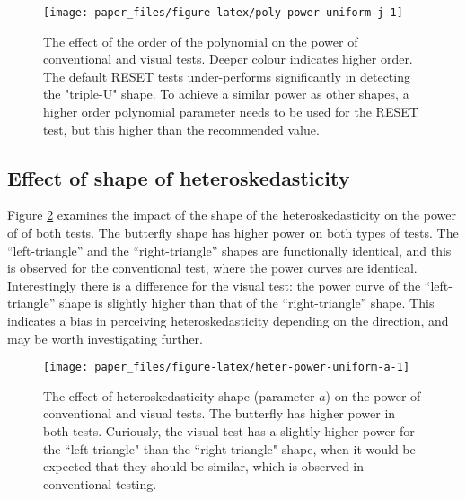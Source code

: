 \documentclass[]{interact}
\theoremstyle{plain}%
\theoremstyle{definition}
\theoremstyle{remark}
\begin{document}
\begin{figure}

{\centering \texttt{[image: paper\_files/figure-latex/poly-power-uniform-j-1]} 

}

\caption{The effect of the order of the polynomial on the power of conventional and visual tests. Deeper colour indicates higher order. The default RESET tests under-performs significantly in detecting the "triple-U" shape. To achieve a similar power as other shapes, a higher order polynomial parameter needs to be used for the RESET test, but this higher than the recommended value.}\label{fig:poly-power-uniform-j}
\end{figure}

\hypertarget{effect-of-shape-of-heteroskedasticity}{%
\subsection{\texorpdfstring{Effect of shape of
heteroskedasticity\label{hetero-analysis}}{Effect of shape of heteroskedasticity}}\label{effect-of-shape-of-heteroskedasticity}}

Figure \ref{fig:heter-power-uniform-a} examines the impact of the shape
of the heteroskedasticity on the power of of both tests. The butterfly
shape has higher power on both types of tests. The ``left-triangle'' and
the ``right-triangle'' shapes are functionally identical, and this is
observed for the conventional test, where the power curves are
identical. Interestingly there is a difference for the visual test: the
power curve of the ``left-triangle'' shape is slightly higher than that
of the ``right-triangle'' shape. This indicates a bias in perceiving
heteroskedasticity depending on the direction, and may be worth
investigating further.

\begin{figure}

{\centering \texttt{[image: paper\_files/figure-latex/heter-power-uniform-a-1]} 

}

\caption{The effect of heteroskedasticity shape (parameter $a$) on the power of conventional and visual tests. The butterfly has higher power in both tests. Curiously, the visual test has a slightly higher power for the ``left-triangle" than the ``right-triangle" shape, when it would be expected that they should be similar, which is observed in conventional testing.}\label{fig:heter-power-uniform-a}
\end{figure}
\end{document}
